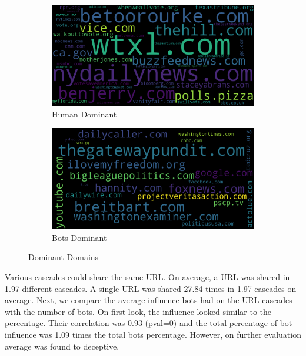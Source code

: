 \documentclass[letterpaper]{article}
\begin{document}
\begin{figure}[H]
    \centering
    \captionsetup{justification=centering}

    \begin{subfigure}[b]{0.4\linewidth}
      \includegraphics[width=\linewidth]{images/mostly_human_urls.png}
      \caption{Human Dominant}
    \end{subfigure}
    \begin{subfigure}[b]{0.4\linewidth}
      \includegraphics[width=\linewidth]{images/mostly_bots_urls.png}
      \caption{Bots Dominant}
    \end{subfigure}
    \caption{Dominant Domains}
\end{figure}

Various cascades could share the same URL. On average, a URL was shared in 1.97 different cascades. A single URL was shared 27.84 times in 1.97 cascades on average.
Next, we compare the average influence bots had on the URL cascades with the number of bots. On first look, the influence looked similar to the percentage. Their correlation was 0.93 
(pval=0) and the total percentage of bot influence was 1.09 times the total bots percentage. However, on further evaluation average was found to deceptive.
\end{document}
